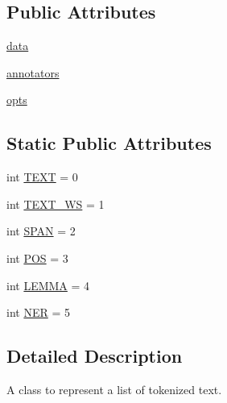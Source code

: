 \subsection*{Public Attributes}
\begin{DoxyCompactItemize}
\item 
\hyperlink{classparlai_1_1agents_1_1tfidf__retriever_1_1tokenizers_1_1tokenizer_1_1Tokens_ad5068b92d72245d43fd75dbb4c070a27}{data}
\item 
\hyperlink{classparlai_1_1agents_1_1tfidf__retriever_1_1tokenizers_1_1tokenizer_1_1Tokens_a394834203475385444a933440dcdd026}{annotators}
\item 
\hyperlink{classparlai_1_1agents_1_1tfidf__retriever_1_1tokenizers_1_1tokenizer_1_1Tokens_ada7339fd7da0200a4260970771f9bfe9}{opts}
\end{DoxyCompactItemize}
\subsection*{Static Public Attributes}
\begin{DoxyCompactItemize}
\item 
int \hyperlink{classparlai_1_1agents_1_1tfidf__retriever_1_1tokenizers_1_1tokenizer_1_1Tokens_a9aa424cb61b8e4fa45019647aa3a469f}{T\+E\+XT} = 0
\item 
int \hyperlink{classparlai_1_1agents_1_1tfidf__retriever_1_1tokenizers_1_1tokenizer_1_1Tokens_ac1965a5c7e633c9824f5de66b5211325}{T\+E\+X\+T\+\_\+\+WS} = 1
\item 
int \hyperlink{classparlai_1_1agents_1_1tfidf__retriever_1_1tokenizers_1_1tokenizer_1_1Tokens_a854cddac2a5c84a5d770aa938f304f09}{S\+P\+AN} = 2
\item 
int \hyperlink{classparlai_1_1agents_1_1tfidf__retriever_1_1tokenizers_1_1tokenizer_1_1Tokens_ac86fd8e346abb9582109d8e11e5f9b48}{P\+OS} = 3
\item 
int \hyperlink{classparlai_1_1agents_1_1tfidf__retriever_1_1tokenizers_1_1tokenizer_1_1Tokens_a0edd5b712de93117c645a869bda3206a}{L\+E\+M\+MA} = 4
\item 
int \hyperlink{classparlai_1_1agents_1_1tfidf__retriever_1_1tokenizers_1_1tokenizer_1_1Tokens_a23de330eaa8a95b1eec932b960384516}{N\+ER} = 5
\end{DoxyCompactItemize}


\subsection{Detailed Description}
\begin{DoxyVerb}A class to represent a list of tokenized text.\end{DoxyVerb}
 

